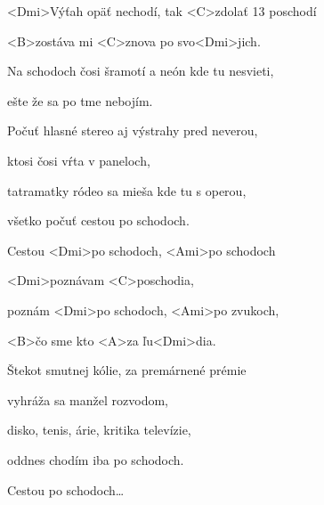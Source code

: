 

\zs
<Dmi>Výťah opäť nechodí, tak <C>zdolať 13 poschodí

<B>zostáva mi <C>znova po svo<Dmi>jich.

Na schodoch čosi šramotí a neón kde tu nesvieti,

ešte že sa po tme nebojím.
\ks

\zs
Počuť hlasné stereo aj výstrahy pred neverou,

ktosi čosi vŕta v paneloch,

tatramatky ródeo sa mieša kde tu s operou,

všetko počuť cestou po schodoch.
\ks

\zr
Cestou <Dmi>po schodoch, <Ami>po schodoch

<Dmi>poznávam <C>poschodia,

poznám <Dmi>po schodoch, <Ami>po zvukoch,

<B>čo sme kto <A>za ľu<Dmi>dia.
\kr

\zs
Štekot smutnej kólie, za premárnené prémie

vyhráža sa manžel rozvodom,

disko, tenis, árie, kritika televízie,

oddnes chodím iba po schodoch.
\ks

\zr
Cestou po schodoch…
\kr

\kp
